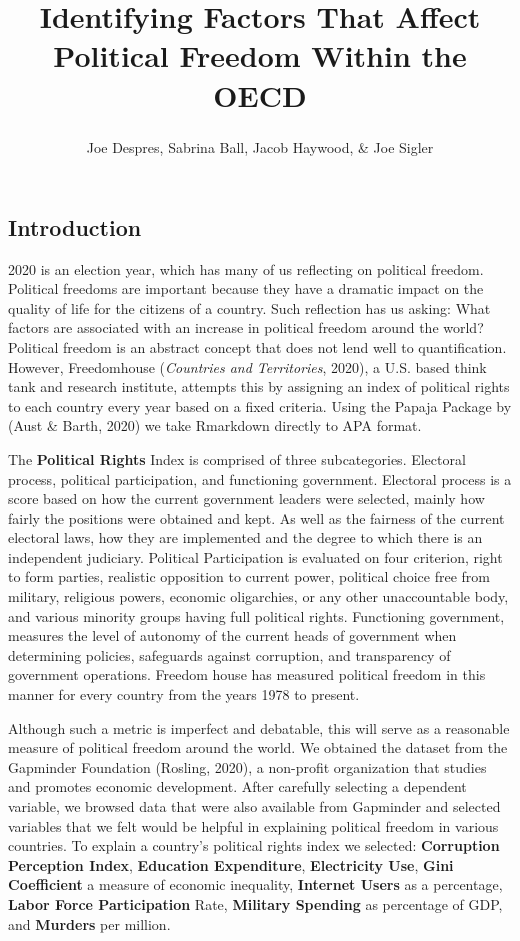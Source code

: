 \documentclass[
  english,
  man,floatsintext]{apa6}
\title{Identifying Factors That Affect Political Freedom Within the OECD}
\author{Joe Despres\textsuperscript{}, Sabrina Ball\textsuperscript{}, Jacob Haywood\textsuperscript{}, \& Joe Sigler\textsuperscript{}}
\date{}
\affiliation{\vspace{0.5cm}\textsuperscript{} Michigan State University\\
November 30, 2020}
\begin{document}
\maketitle

\hypertarget{introduction}{%
\subsection{Introduction}\label{introduction}}

2020 is an election year, which has many of us reflecting on political freedom. Political freedoms are important because they have a dramatic impact on the quality of life for the citizens of a country. Such reflection has us asking: What factors are associated with an increase in political freedom around the world? Political freedom is an abstract concept that does not lend well to quantification. However, Freedomhouse (\emph{Countries and Territories}, 2020), a U.S. based think tank and research institute, attempts this by assigning an index of political rights to each country every year based on a fixed criteria. Using the Papaja Package by (Aust \& Barth, 2020) we take Rmarkdown directly to APA format.

The \textbf{Political Rights} Index is comprised of three subcategories. Electoral process, political participation, and functioning government. Electoral process is a score based on how the current government leaders were selected, mainly how fairly the positions were obtained and kept. As well as the fairness of the current electoral laws, how they are implemented and the degree to which there is an independent judiciary. Political Participation is evaluated on four criterion, right to form parties, realistic opposition to current power, political choice free from military, religious powers, economic oligarchies, or any other unaccountable body, and various minority groups having full political rights. Functioning government, measures the level of autonomy of the current heads of government when determining policies, safeguards against corruption, and transparency of government operations. Freedom house has measured political freedom in this manner for every country from the years 1978 to present.

Although such a metric is imperfect and debatable, this will serve as a reasonable measure of political freedom around the world. We obtained the dataset from the Gapminder Foundation (Rosling, 2020), a non-profit organization that studies and promotes economic development. After carefully selecting a dependent variable, we browsed data that were also available from Gapminder and selected variables that we felt would be helpful in explaining political freedom in various countries. To explain a country's political rights index we selected: \textbf{Corruption Perception Index}, \textbf{Education Expenditure}, \textbf{Electricity Use}, \textbf{Gini Coefficient} a measure of economic inequality, \textbf{Internet Users} as a percentage, \textbf{Labor Force Participation} Rate, \textbf{Military Spending} as percentage of GDP, and \textbf{Murders} per million.
\end{document}
